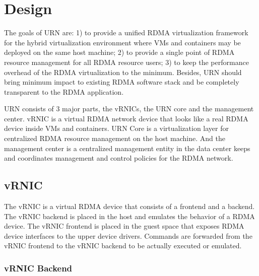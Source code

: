 \section{Design}

The goals of URN are: 1) to provide a unified RDMA virtualization framework for the hybrid virtualization environment where VMs and containers may be deployed on the same host machine; 2) to provide a single point of RDMA resource management for all RDMA resource users; 3) to keep the performance overhead of the RDMA virtualization to the minimum. Besides, URN should bring minimum impact to existing RDMA software stack and be completely transparent to the RDMA application. 

URN consists of 3 major parts, the vRNICs, the URN core and the management center. vRNIC is a virtual RDMA network device that looks like a real RDMA device inside VMs and containers. URN Core is a virtualization layer for centralized RDMA resource management on the host machine. And the management center is a centralized management entity in the data center keeps and coordinates management and control policies for the RDMA network.

\subsection{vRNIC}

The vRNIC is a virtual RDMA device that consists of a frontend and a backend. The vRNIC backend is placed in the host and emulates the behavior of a RDMA device. The vRNIC frontend is placed in the guest space that exposes RDMA device interfaces to the upper device drivers. Commands are forwarded from the vRNIC frontend to the vRNIC backend to be actually executed or emulated.

\subsubsection{vRNIC Backend}

